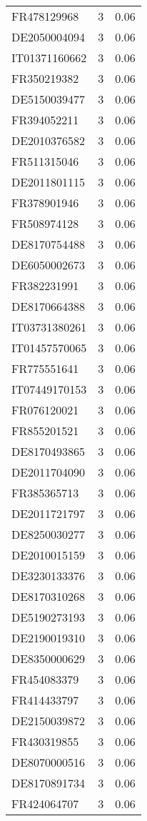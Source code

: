 \begin{table*}[htbp]
\begin{tabular}{lrr}
FR478129968 & 3 & 0.06 \\
DE2050004094 & 3 & 0.06 \\
IT01371160662 & 3 & 0.06 \\
FR350219382 & 3 & 0.06 \\
DE5150039477 & 3 & 0.06 \\
FR394052211 & 3 & 0.06 \\
DE2010376582 & 3 & 0.06 \\
FR511315046 & 3 & 0.06 \\
DE2011801115 & 3 & 0.06 \\
FR378901946 & 3 & 0.06 \\
FR508974128 & 3 & 0.06 \\
DE8170754488 & 3 & 0.06 \\
DE6050002673 & 3 & 0.06 \\
FR382231991 & 3 & 0.06 \\
DE8170664388 & 3 & 0.06 \\
IT03731380261 & 3 & 0.06 \\
IT01457570065 & 3 & 0.06 \\
FR775551641 & 3 & 0.06 \\
IT07449170153 & 3 & 0.06 \\
FR076120021 & 3 & 0.06 \\
FR855201521 & 3 & 0.06 \\
DE8170493865 & 3 & 0.06 \\
DE2011704090 & 3 & 0.06 \\
FR385365713 & 3 & 0.06 \\
DE2011721797 & 3 & 0.06 \\
DE8250030277 & 3 & 0.06 \\
DE2010015159 & 3 & 0.06 \\
DE3230133376 & 3 & 0.06 \\
DE8170310268 & 3 & 0.06 \\
DE5190273193 & 3 & 0.06 \\
DE2190019310 & 3 & 0.06 \\
DE8350000629 & 3 & 0.06 \\
FR454083379 & 3 & 0.06 \\
FR414433797 & 3 & 0.06 \\
DE2150039872 & 3 & 0.06 \\
FR430319855 & 3 & 0.06 \\
DE8070000516 & 3 & 0.06 \\
DE8170891734 & 3 & 0.06 \\
FR424064707 & 3 & 0.06 \\

\end{tabular}
\end{table*}
